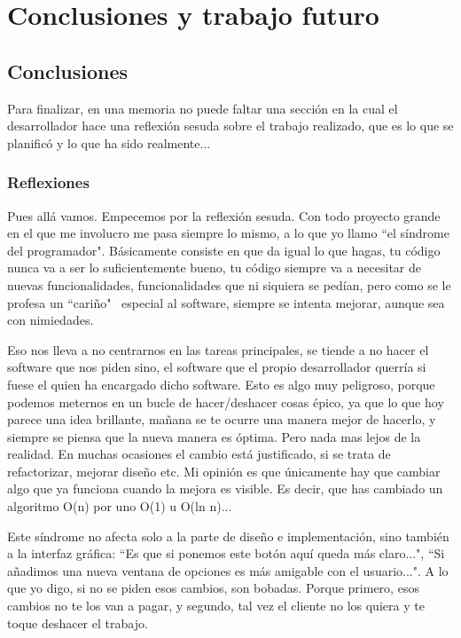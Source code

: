 \chapter{Conclusiones y trabajo futuro}

\section{Conclusiones}
Para finalizar, en una memoria no puede faltar una secci\'on en la cual el desarrollador
hace una reflexi\'on sesuda sobre el trabajo realizado, que es lo que se planific\'o
y lo que ha sido realmente...

\subsection{Reflexiones}
Pues all\'a vamos. Empecemos por la reflexi\'on sesuda.
Con todo proyecto grande en el que me involucro me pasa siempre lo mismo, a lo que yo llamo
``el  s\'indrome del programador". B\'asicamente consiste en que da igual lo que hagas,
tu c\'odigo nunca va a ser lo suficientemente bueno, tu c\'odigo siempre va a necesitar
de nuevas funcionalidades, funcionalidades que ni siquiera se ped\'ian, pero como se le profesa
un ``cari\~no" \ especial al software, siempre se intenta mejorar, aunque sea con nimiedades.

Eso nos lleva a no centrarnos en las tareas principales, se tiende a no hacer el software que nos piden
sino, el software que el propio desarrollador querr\'ia si fuese el quien ha encargado dicho software.
Esto es algo muy peligroso, porque podemos meternos en un bucle de hacer/deshacer cosas \'epico, ya que
lo que hoy parece una idea brillante, ma\~nana se te ocurre una manera mejor de hacerlo, y siempre
se piensa que la nueva manera es \'optima. Pero nada mas lejos de la realidad. En muchas ocasiones el
cambio est\'a justificado, si se trata de refactorizar, mejorar dise\~no etc. Mi opini\'on es que \'unicamente
hay que cambiar algo que ya funciona cuando la mejora es visible. Es decir, que has cambiado un algoritmo O(n)
por uno O(1) u O(ln n)...

Este s\'indrome no afecta solo a la parte de dise\~no e implementaci\'on, sino tambi\'en a la interfaz gr\'afica:
``Es que si ponemos este bot\'on aqu\'i queda m\'as claro...", ``Si a\~nadimos una nueva ventana de opciones es m\'as
amigable con el usuario...". A lo que yo digo, si no se piden esos cambios, son bobadas. Porque primero, esos cambios
no te los van a pagar, y segundo, tal vez el cliente no los quiera y te toque deshacer el trabajo.


